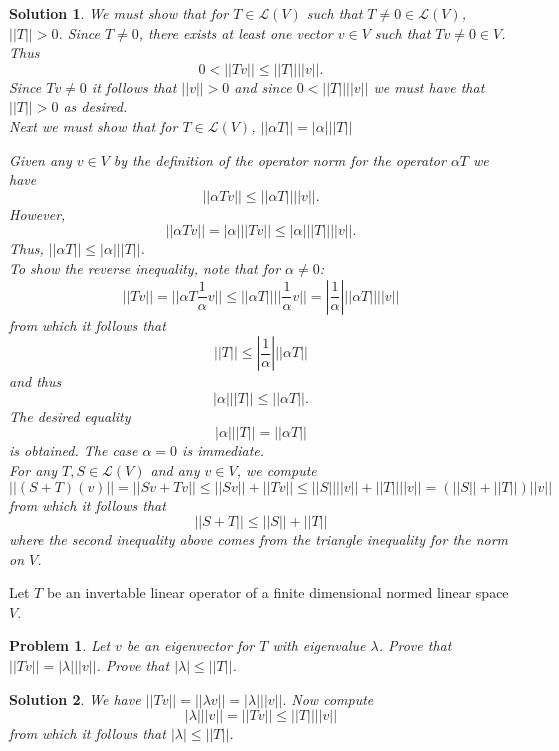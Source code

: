 \documentclass{article}
\theoremstyle{problemstyle}
\newtheorem{problem}{Problem}
\theoremstyle{problemstyle}
\newtheorem{solution}{Solution}
\theoremstyle{problemstyle}
\theoremstyle{problemstyle}
\begin{document}
\begin{solution}
We must show that for $T \in \mathscr{L}(V)$ such that $T \neq 0 \in \mathscr{L}(V)$, $||T|| > 0$. 
Since $T \neq 0$, there exists at least one vector $v \in V$ such that $Tv \neq 0 \in V$. Thus 
\begin{equation*}
0<||Tv|| \leq ||T||||v||.
\end{equation*}
Since $Tv \neq 0$ it follows that $||v|| > 0$ and since $0< ||T|| ||v||$ we must have that $||T||>0$ as desired.\\
\vspace{3mm}
Next we must show that for $T \in \mathscr{L}(V)$, $||\alpha T|| = |\alpha| ||T||$

Given any $v \in V$ by the definition of the operator norm for the operator $\alpha T$ we have   $$||\alpha T v|| \leq ||\alpha T||||v||.$$ However, $$||\alpha T v||  = |\alpha|||Tv|| \leq |\alpha|||T|| ||v||.$$ Thus, $||\alpha T|| \leq |\alpha|||T||$. \\
\vspace{3mm}
To show the reverse inequality, note that for $\alpha \neq 0$: $$||Tv|| = ||\alpha T \frac{1}{\alpha} v|| \leq ||\alpha T||||\frac{1}{\alpha}v|| = |\frac{1}{\alpha}|||\alpha T||||v||$$ from which it follows that $$||T|| \leq |\frac{1}{\alpha}|||\alpha T||$$ and thus $$|\alpha|||T|| \leq ||\alpha T||.$$ The desired equality $$|\alpha|||T|| = ||\alpha T||$$ is obtained. The case $\alpha = 0$ is immediate.\\
\vspace{3mm}
For any $T,S \in \mathscr{L}(V)$ and any $v \in V$, we compute $$||(S+T)(v)|| = ||Sv + Tv|| \leq ||Sv|| + ||Tv|| \leq ||S||||v|| + ||T||||v|| = (||S|| + ||T||)||v||$$ from which it follows that $$||S+T|| \leq ||S|| + ||T||$$ where the second inequality above comes from the triangle inequality for the norm on $V$.
\end{solution}

Let $T$ be an invertable linear operator of a finite dimensional normed linear space $V$. 

\begin{problem}
Let $v$ be an eigenvector for $T$ with eigenvalue $\lambda$. Prove that $||Tv|| = |\lambda|||v||$. Prove that $|\lambda| \leq ||T||$. 
\end{problem}

\begin{solution}
We have $||Tv|| = ||\lambda v|| = |\lambda|||v||.$ Now compute $$|\lambda|||v|| = ||Tv|| \leq ||T||||v||$$ from which it follows that $|\lambda| \leq ||T||$. 
\end{solution}
\end{document}
